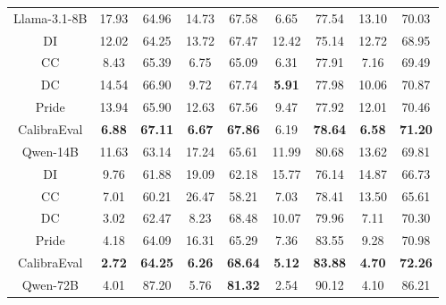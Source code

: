 \documentclass[sigconf]{acmart}
\begin{document}
\begin{table}[t]
\begin{tabular}{c|cc|cc|cc|cc}
Llama-3.1-8B           & 17.93           & 64.96          & 14.73         & 67.58          & 6.65              & 77.54             & 13.10         & 70.03          \\
DI                     & 12.02  & 64.25          & 13.72         & 67.47          & 12.42             & 75.14             & 12.72         & 68.95          \\
CC                     & 8.43            & 65.39          & 6.75          & 65.09          & 6.31              & 77.91             & 7.16          & 69.49          \\
DC                     & 14.54           & 66.90          & 9.72          & 67.74          & \textbf{5.91}     & 77.98             & 10.06         & 70.87          \\
Pride                  & 13.94           & 65.90          & 12.63         & 67.56          & 9.47              & 77.92             & 12.01         & 70.46          \\
CalibraEval            & \textbf{6.88}   & \textbf{67.11} & \textbf{6.67} & \textbf{67.86} & 6.19              & \textbf{78.64}    & \textbf{6.58} & \textbf{71.20} \\ \hline
Qwen-14B               & 11.63           & 63.14          & 17.24         & 65.61          & 11.99             & 80.68             & 13.62         & 69.81          \\
DI                     & 9.76            & 61.88          & 19.09         & 62.18          & 15.77             & 76.14             & 14.87         & 66.73          \\
CC                     & 7.01            & 60.21          & 26.47         & 58.21          & 7.03              & 78.41             & 13.50         & 65.61          \\
DC                     & 3.02            & 62.47          & 8.23          & 68.48          & 10.07             & 79.96             & 7.11          & 70.30          \\
Pride                  & 4.18            & 64.09          & 16.31         & 65.29          & 7.36              & 83.55             & 9.28          & 70.98          \\
CalibraEval            & \textbf{2.72}   & \textbf{64.25} & \textbf{6.26} & \textbf{68.64} & \textbf{5.12}     & \textbf{83.88}    & \textbf{4.70} & \textbf{72.26} \\ \hline
Qwen-72B               & 4.01            & 87.20          & 5.76          & \textbf{81.32} & 2.54              & 90.12             & 4.10          & 86.21          \\

\end{tabular}
\end{table}
\end{document}

